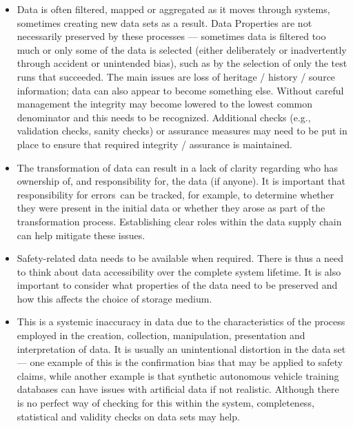 \begin{itemize}
  \item {} Data is often filtered, mapped or aggregated as it moves through systems, sometimes creating new data sets as a result. Data Properties are not necessarily preserved by these processes --- sometimes data is filtered too much or only some of the data is selected (either deliberately or inadvertently through accident or unintended bias), such as by the selection of only the test runs that succeeded. The main issues are loss of heritage / history / source information; data can also appear to become something else. Without careful management the integrity may become lowered to the lowest common denominator and this needs to be recognized. Additional checks (e.g., validation checks, sanity checks) or assurance measures may need to be put in place to ensure that required integrity / assurance is maintained.

  \item {} The transformation of data can result in a lack of clarity regarding who has ownership of, and responsibility for, the data (if anyone). It is important that responsibility for \cbstart\glspl{error}\cbend\ can be tracked, for example, to determine whether they were present in the initial data or whether they arose as part of the transformation process. Establishing clear roles within the data supply chain can help mitigate these issues.

  \item {} Safety-related data needs to be available when required. There is thus a need to think about data accessibility over the complete system lifetime. It is also important to consider what properties of the data need to be preserved and how this affects the choice of storage medium.

  \item {} This is a systemic inaccuracy in data due to the characteristics of the process employed in the creation, collection, manipulation, presentation and interpretation of data. It is usually an unintentional distortion in the data set --- one example of this is the confirmation bias that may be applied to safety claims,
    while another example is that synthetic autonomous vehicle training \glspl{database} can have issues with artificial data if not realistic.
    Although there is no perfect way of checking for this within the system, \gls{completeness}, statistical and validity checks on data sets may help.


\end{itemize}

